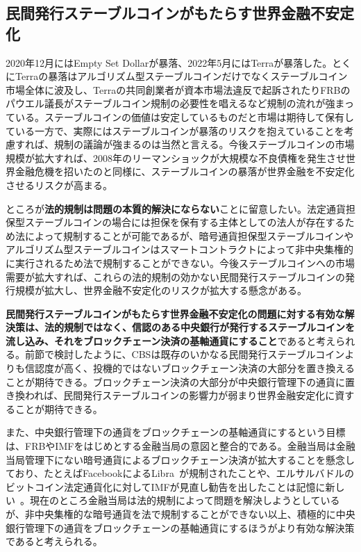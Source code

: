 \documentclass[dvipdfmx,a4paper]{jsarticle}
\begin{document}
\subsection{民間発行ステーブルコインがもたらす世界金融不安定化}

2020年12月にはEmpty Set Dollarが暴落、2022年5月にはTerraが暴落した。とくにTerraの暴落はアルゴリズム型ステーブルコインだけでなくステーブルコイン市場全体に波及し、Terraの共同創業者が資本市場法違反で起訴されたりFRBのパウエル議長がステーブルコイン規制の必要性を唱えるなど規制の流れが強まっている。ステーブルコインの価値は安定しているものだと市場は期待して保有している一方で、実際にはステーブルコインが暴落のリスクを抱えていることを考慮すれば、規制の議論が強まるのは当然と言える。今後ステーブルコインの市場規模が拡大すれば、2008年のリーマンショックが大規模な不良債権を発生させ世界金融危機を招いたのと同様に、ステーブルコインの暴落が世界金融を不安定化させるリスクが高まる。

ところが\textbf{法的規制は問題の本質的解決にならない}ことに留意したい。法定通貨担保型ステーブルコインの場合には担保を保有する主体としての法人が存在するため法によって規制することが可能であるが、暗号通貨担保型ステーブルコインやアルゴリズム型ステーブルコインはスマートコントラクトによって非中央集権的に実行されるため法で規制することができない。今後ステーブルコインへの市場需要が拡大すれば、これらの法的規制の効かない民間発行ステーブルコインの発行規模が拡大し、世界金融不安定化のリスクが拡大する懸念がある。

\textbf{民間発行ステーブルコインがもたらす世界金融不安定化の問題に対する有効な解決策は、法的規制ではなく、信認のある中央銀行が発行するステーブルコインを流し込み、それをブロックチェーン決済の基軸通貨にすること}であると考えられる。前節で検討したように、CBSは既存のいかなる民間発行ステーブルコインよりも信認度が高く、投機的ではないブロックチェーン決済の大部分を置き換えることが期待できる。ブロックチェーン決済の大部分が中央銀行管理下の通貨に置き換われば、民間発行ステーブルコインの影響力が弱まり世界金融安定化に資することが期待できる。

また、中央銀行管理下の通貨をブロックチェーンの基軸通貨にするという目標は、FRBやIMFをはじめとする金融当局の意図と整合的である。金融当局は金融当局管理下にない暗号通貨によるブロックチェーン決済が拡大することを懸念しており、たとえばFacebookによるLibra~\cite{libra}が規制されたことや、エルサルバドルのビットコイン法定通貨化に対してIMFが見直し勧告を出したことは記憶に新しい~\cite{imfelsalvador}。現在のところ金融当局は法的規制によって問題を解決しようとしているが、非中央集権的な暗号通貨を法で規制することができない以上、積極的に中央銀行管理下の通貨をブロックチェーンの基軸通貨にするほうがより有効な解決策であると考えられる。
\end{document}
